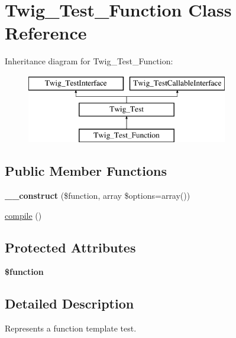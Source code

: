\hypertarget{class_twig___test___function}{}\section{Twig\+\_\+\+Test\+\_\+\+Function Class Reference}
\label{class_twig___test___function}
Inheritance diagram for Twig\+\_\+\+Test\+\_\+\+Function\+:\begin{figure}[H]
\begin{center}
\leavevmode
\includegraphics[height=3.000000cm]{class_twig___test___function}
\end{center}
\end{figure}
\subsection*{Public Member Functions}
\begin{DoxyCompactItemize}
\item 
\hypertarget{class_twig___test___function_ae6ad9907bb7237c92e880ca6bfd16469}{}{\bfseries \+\_\+\+\_\+construct} (\$function, array \$options=array())\label{class_twig___test___function_ae6ad9907bb7237c92e880ca6bfd16469}

\item 
\hyperlink{class_twig___test___function_a3815e7c2e73f00c2ebffcf5b90eef3b1}{compile} ()
\end{DoxyCompactItemize}
\subsection*{Protected Attributes}
\begin{DoxyCompactItemize}
\item 
\hypertarget{class_twig___test___function_af3e5d0d1ff43879d493dd97bb760c479}{}{\bfseries \$function}\label{class_twig___test___function_af3e5d0d1ff43879d493dd97bb760c479}

\end{DoxyCompactItemize}


\subsection{Detailed Description}
Represents a function template test.


